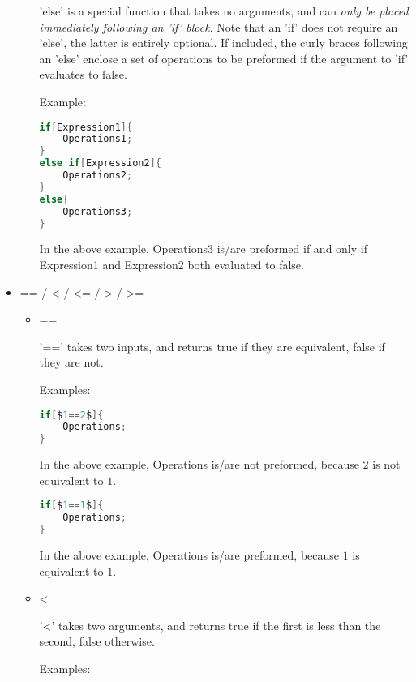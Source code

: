 \begin{itemize}
\begin{itemize}
\begin{center}
'else' is a special function that takes no arguments, and can \emph{only be placed immediately following an 'if' block}. Note that an 'if' does not require an 'else', the latter is entirely optional. If included, the curly braces following an 'else' enclose a set of operations to be preformed if the argument to 'if' evaluates to false.
\end{center}
Example:\\
\begin{lstlisting}[language=C,caption=else if Example,label=lst:elsex,mathescape]
if[Expression1]{
	Operations1;
}
else if[Expression2]{
	Operations2;
}
else{
	Operations3;
}
\end{lstlisting}
\begin{center}
In the above example, Operations3 is/are preformed if and only if Expression1 and Expression2 both evaluated to false.
\end{center}
\end{itemize}
\item == / < / <= / > / >=
\begin{itemize}
\item ==
\begin{center}
'==' takes two inputs, and returns true if they are equivalent, false if they are not.
\end{center}
Examples:
\begin{lstlisting}[language=C,caption=Equivalence Example 1,label=lst:eqex1,mathescape]
if[$1==2$]{
	Operations;
}
\end{lstlisting}
\begin{center}
In the above example, Operations is/are not preformed, because $2$ is not equivalent to $1$.
\end{center}
\begin{lstlisting}[language=C,caption=Equivalence Example 2,label=lst:eqex2,mathescape]
if[$1==1$]{
	Operations;
}
\end{lstlisting}
\begin{center}
In the above example, Operations is/are preformed, because $1$ is equivalent to $1$.
\end{center}
\item < \\
\begin{center}
'<' takes two arguments, and returns true if the first is less than the second, false otherwise.
\end{center}
Examples:
\begin{lstlisting}[language=C,caption=Less Than Example 1,label=lst:ltex1]

\end{lstlisting}
\end{itemize}
\end{itemize}
